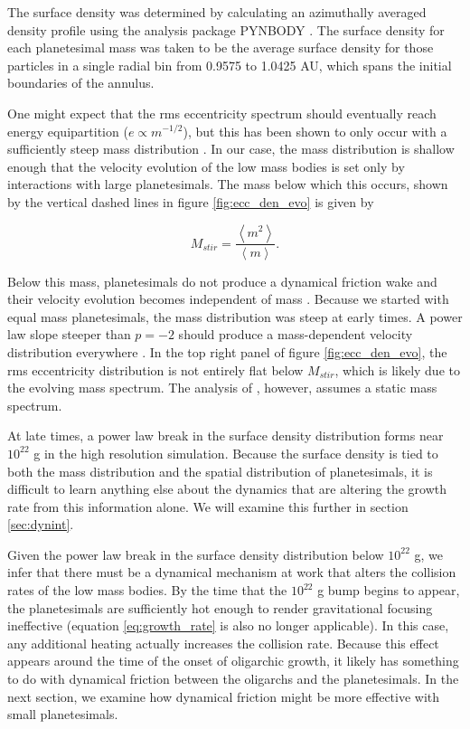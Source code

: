 The surface density was determined by calculating an azimuthally averaged density profile using the analysis package
{\sc PYNBODY} \cite{pontzen13}. The surface density for each planetesimal mass was taken to be the average surface density 
for those particles in a single radial bin from 0.9575 to 1.0425 AU, which spans the initial boundaries of the annulus.

One might expect that the rms eccentricity spectrum should eventually reach energy equipartition ($e \propto m^{-1/2}$), but this 
has been shown to only occur with a sufficiently steep mass distribution \cite{rafikov03}. In our case, the mass distribution is 
shallow enough that the velocity evolution of the low mass bodies is set only by interactions with large planetesimals. The mass 
below which this occurs, shown by the vertical dashed lines in figure \ref{fig:ecc_den_evo} is given by
\cite{wetherill93, ormel10}

\begin{equation}\label{eq:mstir}
M_{stir} = \frac{\left< m^2 \right>}{\left< m \right>}.
\end{equation}

Below this mass, planetesimals do not produce a dynamical friction wake and their velocity evolution becomes independent of 
mass \cite{rafikov03}. Because we started with equal mass planetesimals, the mass distribution was steep at early times. A 
power law slope steeper than $p = -2$ should produce a mass-dependent velocity distribution everywhere \cite{rafikov03}. In 
the top right panel of figure \ref{fig:ecc_den_evo}, the rms eccentricity distribution is not entirely flat below $M_{stir}$, which is 
likely due to the evolving mass spectrum. The analysis of \cite{rafikov03}, however, assumes a static mass spectrum.

At late times, a power law break in the surface density distribution forms near $10^{22}$ g in the high resolution simulation. 
Because the surface density is tied to both the mass distribution and the spatial distribution of planetesimals, it is difficult to learn 
anything else about the dynamics that are altering the growth rate from this information alone. We will examine this further in 
section \ref{sec:dynint}.

Given the power law break in the surface density distribution below $10^{22}$ g, we infer that there must be a dynamical 
mechanism at work that alters the collision rates of the low mass bodies. By the time that the $10^{22}$ g bump begins to 
appear, the planetesimals are sufficiently hot enough to render gravitational focusing ineffective (equation \ref{eq:growth_rate} is 
also no longer applicable). In this case, any additional heating actually increases the collision rate. Because this effect appears 
around the time of the onset of oligarchic growth, it likely has something to do with dynamical friction between the oligarchs and 
the planetesimals. In the next section, we examine how dynamical friction might be more effective with small planetesimals.

